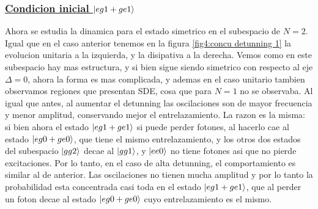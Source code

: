 \subsubsection{\underline{Condicion inicial $\ket{eg1+ge1}$}}
Ahora se estudia la dinamica para el estado simetrico en el subespacio de $N=2$. Igual que en el caso anterior tenemos en la figura \ref{fig4:concu detunning 1} la evolucion unitaria a la izquierda, y la disipativa a la derecha. Vemos como en este subespacio hay mas estructura, y si bien sigue siendo simetrico con respecto al eje $\Delta=0$, ahora la forma es mas complicada, y ademas en el caso unitario tambien observamos regiones que presentan SDE, cosa que para $N=1$ no se observaba. Al igual que antes, al aumentar el detunning las oscilaciones son de mayor frecuencia y menor amplitud, conservando mejor el entrelazamiento. La razon es la misma: si bien ahora el estado $\ket{eg1+ge1}$ si puede perder fotones, al hacerlo cae al estado $\ket{eg0+ge0}$, que tiene el mismo entrelazamiento, y los otros dos estados del subespacio $\ket{gg2}$ decae al $\ket{gg1}$, y $\ket{ee0}$ no tiene fotones asi que no pierde excitaciones. Por lo tanto, en el caso de alta detunning, el comportamiento es similar al de anterior. Las oscilaciones no tienen mucha amplitud y por lo tanto la probabilidad esta concentrada casi toda en el estado $\ket{eg1+ge1}$, que al perder un foton decae al estado $\ket{eg0+ge0}$ cuyo entrelazamiento es el mismo.
